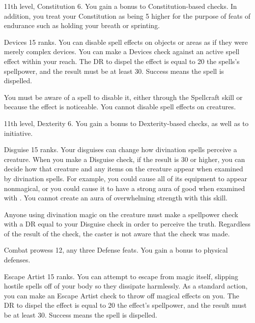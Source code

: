 \featpres 11th level, Constitution 6.
\featben You gain a  bonus to Constitution-based checks.
In addition, you treat your Constitution as being 5 higher for the purpose of feats of endurance such as holding your breath or sprinting.

\featpre Devices 15 ranks.
\featben You can disable spell effects on objects or areas as if they were merely complex devices.
You can make a Devices check against an active spell effect within your reach.
The DR to dispel the effect is equal to 20 \add the spells's spellpower, and the result must be at least 30.
Success means the spell is dispelled.

You must be aware of a spell to disable it, either through the Spellcraft skill or because the effect is noticeable.
You cannot disable spell effects on creatures.

\featpres 11th level, Dexterity 6.
\featben You gain a  bonus to Dexterity-based checks, as well as to initiative.

\featpre Disguise 15 ranks.
\featben Your disguises can change how divination spells perceive a creature.
When you make a Disguise check, if the result is 30 or higher, you can decide how that creature and any items on the creature appear when examined by divination spells.
For example, you could cause all of its equipment to appear nonmagical, or you could cause it to have a strong aura of good when examined with .
You cannot create an aura of overwhelming strength with this skill.

Anyone using divination magic on the creature must make a spellpower check with a DR equal to your Disguise check in order to perceive the truth.
Regardless of the result of the check, the caster is not aware that the check was made.

\featpres Combat prowess 12, any three Defense feats.
\featben You gain a  bonus to physical defenses.

\featpre Escape Artist 15 ranks.
\featben You can attempt to escape from magic itself, slipping hostile spells off of your body so they dissipate harmlessly.
As a standard action, you can make an Escape Artist check to throw off magical effects on you.
The DR to dispel the effect is equal to 20 \add the effect's spellpower, and the result must be at least 30.
Success means the spell is dispelled.

